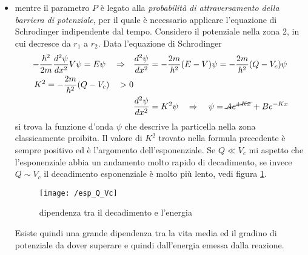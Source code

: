 \begin{itemize}
\item mentre il parametro $P$ è legato alla \emph{probabilità di attraversamento della barriera di potenziale}, per il quale è necessario applicare l'equazione di Schrodinger indipendente dal tempo.
Considero il potenziale nella zona 2, in cui decresce da $r_1$ a $r_2$.
Data l'equazione di Schrodinger
\begin{equation}
\begin{split}
-\frac{\hbar^2}{2m} \frac{d^2 \psi}{dx^2} V \psi = E \psi \quad\Rightarrow\quad 
& \frac{d^2\psi}{dx^2} = - \frac{2m}{\hbar^2} (E-V)\psi = -\frac{2m}{\hbar^2} (Q-V_c)\psi \\
K^2 =  -\frac{2m}{\hbar^2} (Q-V_c) \quad > 0 & \\
&  \frac{d^2\psi}{dx^2} = K^2 \psi \quad\Rightarrow\quad \psi = \cancel{A e^{+ K x}} + Be^{- K x}
\end{split}
\end{equation}
si trova la funzione d'onda $\psi$ che descrive la particella nella zona classicamente proibita.
Il valore di $K^2$ trovato nella formula precedente è sempre positivo ed è l'argomento dell'esponenziale.
Se $Q \ll V_c$ mi aspetto che l'esponenziale abbia un andamento molto rapido di decadimento, se invece $Q \sim V_c$ il decadimento esponenziale è molto più lento, vedi figura \ref{decad_q_Vc}.
\begin{figure}[h]
\centering
\texttt{[image: /esp\_Q\_Vc]}
\caption{dipendenza tra il decadimento e l'energia}
\label{decad_q_Vc}
\end{figure}
Esiste quindi una grande dipendenza tra la vita media ed il gradino di potenziale da dover superare e quindi dall'energia emessa dalla reazione.
\end{itemize}

